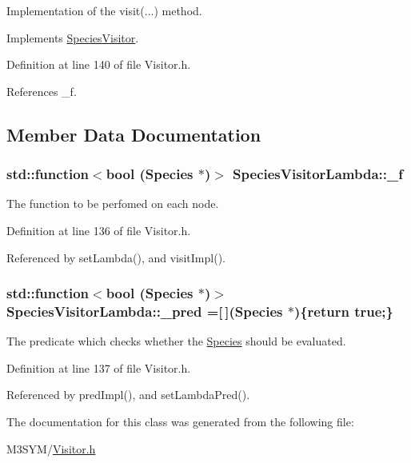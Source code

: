 Implementation of the visit(...) method. 



Implements \hyperlink{classSpeciesVisitor_a6702d4e5a08830afbf069bbe9304689c}{Species\+Visitor}.



Definition at line 140 of file Visitor.\+h.



References \+\_\+f.



\subsection{Member Data Documentation}
\hypertarget{classSpeciesVisitorLambda_a3ebed66a4854319a21d1386558bb02f5}{
\subsubsection[{\+\_\+f}]{\setlength{\rightskip}{0pt plus 5cm}std\+::function$<$bool ({\bf Species} $\ast$)$>$ Species\+Visitor\+Lambda\+::\+\_\+f\hspace{0.3cm}{\ttfamily [protected]}}}\label{classSpeciesVisitorLambda_a3ebed66a4854319a21d1386558bb02f5}


The function to be perfomed on each node. 



Definition at line 136 of file Visitor.\+h.



Referenced by set\+Lambda(), and visit\+Impl().

\hypertarget{classSpeciesVisitorLambda_abf8ae012adcc257d55c0280ad2173eac}{
\subsubsection[{\+\_\+pred}]{\setlength{\rightskip}{0pt plus 5cm}std\+::function$<$bool ({\bf Species} $\ast$)$>$ Species\+Visitor\+Lambda\+::\+\_\+pred =\mbox{[}$\,$\mbox{]}({\bf Species} $\ast$)\{return true;\}\hspace{0.3cm}{\ttfamily [protected]}}}\label{classSpeciesVisitorLambda_abf8ae012adcc257d55c0280ad2173eac}


The predicate which checks whether the \hyperlink{classSpecies}{Species} should be evaluated. 



Definition at line 137 of file Visitor.\+h.



Referenced by pred\+Impl(), and set\+Lambda\+Pred().



The documentation for this class was generated from the following file\+:\begin{DoxyCompactItemize}
\item 
M3\+S\+Y\+M/\hyperlink{Visitor_8h}{Visitor.\+h}\end{DoxyCompactItemize}
